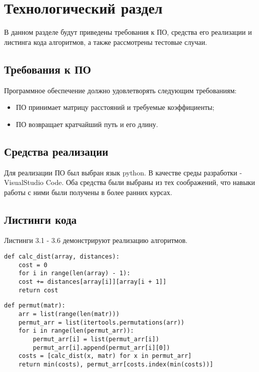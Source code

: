 \chapter{Технологический раздел}

В данном разделе будут приведены требования к ПО, средства его реализации и листинга кода алгоритмов, а также рассмотрены тестовые случаи.

\section{Требования к ПО}

Программное обеспечение должно удовлетворять следующим требованиям:
\begin{itemize}
	\item ПО принимает матрицу расстояний и требуемые коэффициенты;
	\item ПО возвращает кратчайший путь и его длину.
\end{itemize}

\section{Средства реализации} 

Для реализации ПО был выбран язык python. В качестве среды разработки - VisualStudio Code. Оба средства были выбраны из тех соображений, что навыки работы с ними были получены в более ранних курсах.

\section{Листинги кода}

Листинги 3.1 - 3.6 демонстрируют реализацию алгоритмов.

\captionsetup{singlelinecheck = false, justification=raggedright}
\begin{lstlisting}[caption=Функция вычисляющая длину пути]
def calc_dist(array, distances):
	cost = 0
	for i in range(len(array) - 1):
	cost += distances[array[i]][array[i + 1]]
	return cost
\end{lstlisting}

\begin{lstlisting}[caption=Алгоритм полного перебора]
def permut(matr):
	arr = list(range(len(matr)))
	permut_arr = list(itertools.permutations(arr))
	for i in range(len(permut_arr)):
		permut_arr[i] = list(permut_arr[i])
		permut_arr[i].append(permut_arr[i][0])
	costs = [calc_dist(x, matr) for x in permut_arr]
	return min(costs), permut_arr[costs.index(min(costs))]
\end{lstlisting}

